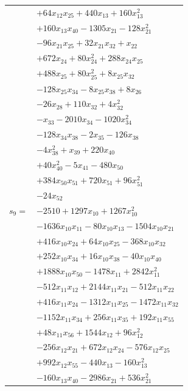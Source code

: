 \begin{longtable}{@{}r@{\;}l@{}}
 & \(\displaystyle +64x_{12}x_{25} +440x_{13} +160x_{13}^{2}\) \\
 & \(\displaystyle +160x_{13}x_{40} -1305x_{21} -128x_{21}^{2}\) \\
 & \(\displaystyle -96x_{21}x_{25} +32x_{21}x_{32} +x_{22}\) \\
 & \(\displaystyle +672x_{24} +80x_{24}^{2} +288x_{24}x_{25}\) \\
 & \(\displaystyle +488x_{25} +80x_{25}^{2} +8x_{25}x_{32}\) \\
 & \(\displaystyle -128x_{25}x_{34} -8x_{25}x_{38} +8x_{26}\) \\
 & \(\displaystyle -26x_{28} +110x_{32} +4x_{32}^{2}\) \\
 & \(\displaystyle -x_{33} -2010x_{34} -1020x_{34}^{2}\) \\
 & \(\displaystyle -128x_{34}x_{38} -2x_{35} -126x_{38}\) \\
 & \(\displaystyle -4x_{38}^{2} +x_{39} +220x_{40}\) \\
 & \(\displaystyle +40x_{40}^{2} -5x_{41} -480x_{50}\) \\
 & \(\displaystyle +384x_{50}x_{51} +720x_{51} +96x_{51}^{2}\) \\
 & \(\displaystyle -24x_{52}\) \\[3pt]
\(s_{9}=\) & \(\displaystyle -2510 +1297x_{10} +1267x_{10}^{2}\) \\
 & \(\displaystyle -1636x_{10}x_{11} -80x_{10}x_{13} -1504x_{10}x_{21}\) \\
 & \(\displaystyle +416x_{10}x_{24} +64x_{10}x_{25} -368x_{10}x_{32}\) \\
 & \(\displaystyle +252x_{10}x_{34} +16x_{10}x_{38} -40x_{10}x_{40}\) \\
 & \(\displaystyle +1888x_{10}x_{50} -1478x_{11} +2842x_{11}^{2}\) \\
 & \(\displaystyle -512x_{11}x_{12} +2144x_{11}x_{21} -512x_{11}x_{22}\) \\
 & \(\displaystyle +416x_{11}x_{24} -1312x_{11}x_{25} -1472x_{11}x_{32}\) \\
 & \(\displaystyle -1152x_{11}x_{34} +256x_{11}x_{35} +192x_{11}x_{55}\) \\
 & \(\displaystyle +48x_{11}x_{56} +1544x_{12} +96x_{12}^{2}\) \\
 & \(\displaystyle -256x_{12}x_{21} +672x_{12}x_{24} -576x_{12}x_{25}\) \\
 & \(\displaystyle +992x_{12}x_{55} -440x_{13} -160x_{13}^{2}\) \\
 & \(\displaystyle -160x_{13}x_{40} -2986x_{21} +536x_{21}^{2}\) \\

\end{longtable}
